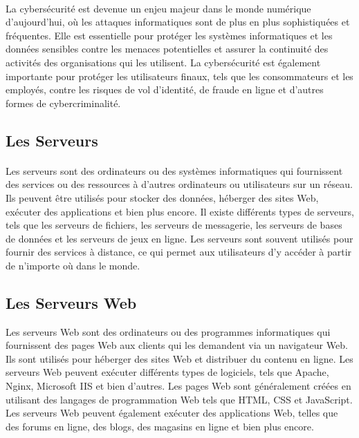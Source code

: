 \documentclass{report}
\begin{document}
  \paragraph{ }
  La cybersécurité est devenue un enjeu majeur dans le monde numérique d'aujourd'hui, où les attaques informatiques sont de plus en plus sophistiquées et fréquentes. Elle est essentielle pour protéger les systèmes informatiques et les données sensibles contre les menaces potentielles et assurer la continuité des activités des organisations qui les utilisent. La cybersécurité est également importante pour protéger les utilisateurs finaux, tels que les consommateurs et les employés, contre les risques de vol d'identité, de fraude en ligne et d'autres formes de cybercriminalité.
  
  \subsection{Les Serveurs }
  \paragraph{ }
  Les serveurs sont des ordinateurs ou des systèmes informatiques qui fournissent des services ou des ressources à d'autres ordinateurs ou utilisateurs sur un réseau. Ils peuvent être utilisés pour stocker des données, héberger des sites Web, exécuter des applications et bien plus encore. Il existe différents types de serveurs, tels que les serveurs de fichiers, les serveurs de messagerie, les serveurs de bases de données et les serveurs de jeux en ligne. Les serveurs sont souvent utilisés pour fournir des services à distance, ce qui permet aux utilisateurs d'y accéder à partir de n'importe où dans le monde.
  \subsection{Les Serveurs Web}
  Les serveurs Web sont des ordinateurs ou des programmes informatiques qui fournissent des pages Web aux clients qui les demandent via un navigateur Web. Ils sont utilisés pour héberger des sites Web et distribuer du contenu en ligne. Les serveurs Web peuvent exécuter différents types de logiciels, tels que Apache, Nginx, Microsoft IIS et bien d'autres. Les pages Web sont généralement créées en utilisant des langages de programmation Web tels que HTML, CSS et JavaScript. Les serveurs Web peuvent également exécuter des applications Web, telles que des forums en ligne, des blogs, des magasins en ligne et bien plus encore.
\end{document}
